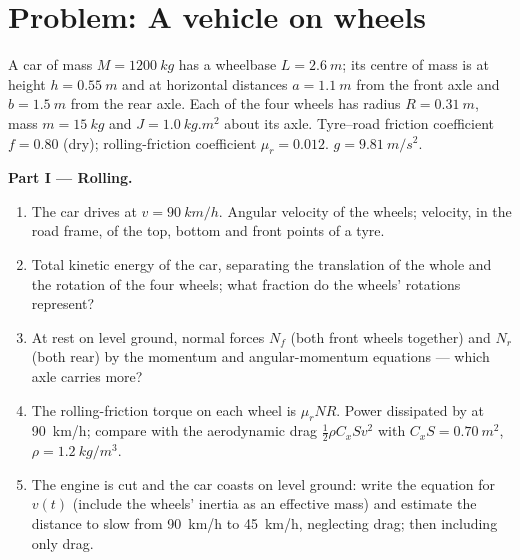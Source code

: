 \section{Problem: A vehicle on wheels}

\begin{problem}
\label{pb:b2:rigid-body-mechanics:1}

A car of mass $M = \qty{1200}{kg}$ has a wheelbase $L = \qty{2.6}{m}$; its
centre of mass is at height $h = \qty{0.55}{m}$ and at horizontal distances
$a = \qty{1.1}{m}$ from the front axle and $b = \qty{1.5}{m}$ from the rear
axle. Each of the four wheels has radius $R = \qty{0.31}{m}$, mass $m =
\qty{15}{kg}$ and  $J = \qty{1.0}{kg.m^2}$ about its axle.
Tyre--road friction coefficient $f = 0.80$ (dry); rolling-friction
coefficient $\mu_r = 0.012$. $g = \qty{9.81}{m/s^2}$.

\medskip
\noindent\textbf{Part I --- Rolling.}
\begin{enumerate}
  \item The car drives at $v = \qty{90}{km/h}$. Angular velocity of the
        wheels; velocity, in the road frame, of the top, bottom and
        front points of a tyre.
  \item Total kinetic energy of the car, separating the translation of
        the whole and the rotation of the four wheels; what fraction do
        the wheels' rotations represent?
  \item At rest on level ground, normal forces $N_f$ (both front wheels
        together) and $N_r$ (both rear) by the momentum and
        angular-momentum equations --- which axle carries more?
  \item The rolling-friction torque on each wheel is $\mu_rNR$. Power
        dissipated by  at \qty{90}{km/h}; compare with
        the aerodynamic drag $\tfrac12\rho C_xSv^2$ with $C_xS =
        \qty{0.70}{m^2}$, $\rho = \qty{1.2}{kg/m^3}$.
  \item The engine is cut and the car coasts on level ground: write the
        equation for $v(t)$ (include the wheels' inertia as an effective
        mass) and estimate the distance to slow from \qty{90}{km/h} to
        \qty{45}{km/h}, neglecting drag; then including only drag.
\end{enumerate}


\end{problem}
